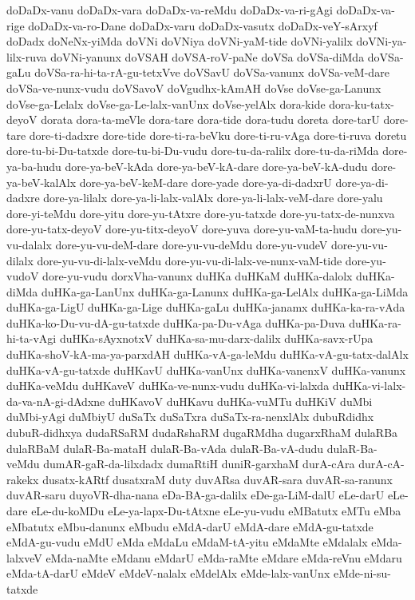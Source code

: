 {doDaDx-vanu
doDaDx-vara
doDaDx-va-reMdu
doDaDx-va-ri-gAgi
doDaDx-va-rige
doDaDx-va-ro-Dane
doDaDx-varu
doDaDx-vasutx
doDaDx-veY-sArxyf
doDadx
doNeNx-yiMda
doVNi
doVNiya
doVNi-yaM-tide
doVNi-yalilx
doVNi-ya-lilx-ruva
doVNi-yanunx
doVSAH
doVSA-roV-paNe
doVSa
doVSa-diMda
doVSa-gaLu
doVSa-ra-hi-ta-rA-gu-tetxVve
doVSavU
doVSa-vanunx
doVSa-veM-dare
doVSa-ve-nunx-vudu
doVSavoV
doVgudhx-kAmAH
doVse
doVse-ga-Lanunx
doVse-ga-Lelalx
doVse-ga-Le-lalx-vanUnx
doVse-yelAlx
dora-kide
dora-ku-tatx-deyoV
dorata
dora-ta-meVle
dora-tare
dora-tide
dora-tudu
doreta
dore-tarU
dore-tare
dore-ti-dadxre
dore-tide
dore-ti-ra-beVku
dore-ti-ru-vAga
dore-ti-ruva
doretu
dore-tu-bi-Du-tatxde
dore-tu-bi-Du-vudu
dore-tu-da-ralilx
dore-tu-da-riMda
dore-ya-ba-hudu
dore-ya-beV-kAda
dore-ya-beV-kA-dare
dore-ya-beV-kA-dudu
dore-ya-beV-kalAlx
dore-ya-beV-keM-dare
dore-yade
dore-ya-di-dadxrU
dore-ya-di-dadxre
dore-ya-lilalx
dore-ya-li-lalx-valAlx
dore-ya-li-lalx-veM-dare
dore-yalu
dore-yi-teMdu
dore-yitu
dore-yu-tAtxre
dore-yu-tatxde
dore-yu-tatx-de-nunxva
dore-yu-tatx-deyoV
dore-yu-titx-deyoV
dore-yuva
dore-yu-vaM-ta-hudu
dore-yu-vu-dalalx
dore-yu-vu-deM-dare
dore-yu-vu-deMdu
dore-yu-vudeV
dore-yu-vu-dilalx
dore-yu-vu-di-lalx-veMdu
dore-yu-vu-di-lalx-ve-nunx-vaM-tide
dore-yu-vudoV
dore-yu-vudu
dorxVha-vanunx
duHKa
duHKaM
duHKa-dalolx
duHKa-diMda
duHKa-ga-LanUnx
duHKa-ga-Lanunx
duHKa-ga-LelAlx
duHKa-ga-LiMda
duHKa-ga-LigU
duHKa-ga-Lige
duHKa-gaLu
duHKa-janamx
duHKa-ka-ra-vAda
duHKa-ko-Du-vu-dA-gu-tatxde
duHKa-pa-Du-vAga
duHKa-pa-Duva
duHKa-ra-hi-ta-vAgi
duHKa-sAyxnotxV
duHKa-sa-mu-darx-dalilx
duHKa-savx-rUpa
duHKa-shoV-kA-ma-ya-parxdAH
duHKa-vA-ga-leMdu
duHKa-vA-gu-tatx-dalAlx
duHKa-vA-gu-tatxde
duHKavU
duHKa-vanUnx
duHKa-vanenxV
duHKa-vanunx
duHKa-veMdu
duHKaveV
duHKa-ve-nunx-vudu
duHKa-vi-lalxda
duHKa-vi-lalx-da-va-nA-gi-dAdxne
duHKavoV
duHKavu
duHKa-vuMTu
duHKiV
duMbi
duMbi-yAgi
duMbiyU
duSaTx
duSaTxra
duSaTx-ra-nenxlAlx
dubuRdidhx
dubuR-didhxya
dudaRSaRM
dudaRshaRM
dugaRMdha
dugarxRhaM
dulaRBa
dulaRBaM
dulaR-Ba-mataH
dulaR-Ba-vAda
dulaR-Ba-vA-dudu
dulaR-Ba-veMdu
dumAR-gaR-da-lilxdadx
dumaRtiH
duniR-garxhaM
durA-cAra
durA-cA-rakekx
dusatx-kARtf
dusatxraM
duty
duvARsa
duvAR-sara
duvAR-sa-ranunx
duvAR-saru
duyoVR-dha-nana
eDa-BA-ga-dalilx
eDe-ga-LiM-dalU
eLe-darU
eLe-dare
eLe-du-koMDu
eLe-ya-lapx-Du-tAtxne
eLe-yu-vudu
eMBatutx
eMTu
eMba
eMbatutx
eMbu-danunx
eMbudu
eMdA-darU
eMdA-dare
eMdA-gu-tatxde
eMdA-gu-vudu
eMdU
eMda
eMdaLu
eMdaM-tA-yitu
eMdaMte
eMdalalx
eMda-lalxveV
eMda-naMte
eMdanu
eMdarU
eMda-raMte
eMdare
eMda-reVnu
eMdaru
eMda-tA-darU
eMdeV
eMdeV-nalalx
eMdelAlx
eMde-lalx-vanUnx
eMde-ni-su-tatxde
}
